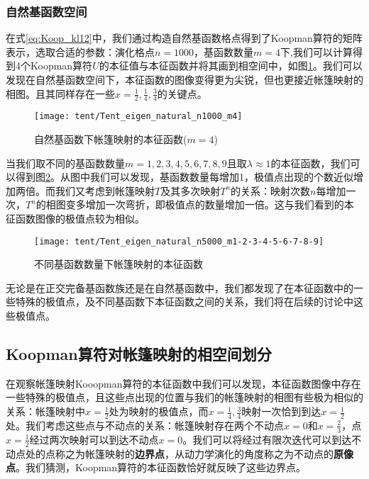 \subsubsection{自然基函数空间}
在式\eqref{eq:Koop_kl12}中，我们通过构造自然基函数格点得到了Koopman算符的矩阵表示，选取合适的参数：演化格点$n=1000$，基函数数量$m=4$下,我们可以计算得到4个Koopman算符$U$的本征值与本征函数并将其画到相空间中，如图\ref{fig:Tent_eigen_natural_n1000_m4}。我们可以发现在自然基函数空间下，本征函数的图像变得更为尖锐，但也更接近帐篷映射的相图。且其同样存在一些$x=\frac{1}{2},\frac{1}{4},\frac{3}{4}$的关键点。
\begin{figure}[!]
	\centering
	\texttt{[image: tent/Tent\_eigen\_natural\_n1000\_m4]}
    \caption{自然基函数下帐篷映射的本征函数($m=4$)}\label{fig:Tent_eigen_natural_n1000_m4}
\end{figure}

当我们取不同的基函数数量$m=1,2,3,4,5,6,7,8,9$且取$\lambda\approx 1$的本征函数，我们可以得到图\ref{Tent_eigen_natural_n5000_m1-2-3-4-5-6-7-8-9}。从图中我们可以发现，基函数数量每增加1，极值点出现的个数近似增加两倍。而我们又考虑到帐篷映射$T$及其多次映射$T^n$的关系：映射次数$n$每增加一次，$T^n$的相图变多增加一次弯折，即极值点的数量增加一倍。这与我们看到的本征函数图像的极值点较为相似。

\begin{figure}[!]
	\centering
	\texttt{[image: tent/Tent\_eigen\_natural\_n5000\_m1-2-3-4-5-6-7-8-9]}
    \caption{不同基函数数量下帐篷映射的本征函数}\label{Tent_eigen_natural_n5000_m1-2-3-4-5-6-7-8-9}
\end{figure}

无论是在正交完备基函数族还是在自然基函数中，我们都发现了在本征函数中的一些特殊的极值点，及不同基函数下本征函数之间的关系，我们将在后续的讨论中这些极值点。

\subsection{Koopman算符对帐篷映射的相空间划分}
在观察帐篷映射Kooopman算符的本征函数中我们可以发现，本征函数图像中存在一些特殊的极值点，且这些点出现的位置与我们的帐篷映射的相图有些极为相似的关系：帐篷映射中$x=\frac{1}{2}$处为映射的极值点，而$x=\frac{1}{4},\frac{3}{4}$映射一次恰到到达$x=\frac{1}{2}$处。我们考虑这些点与不动点的关系：帐篷映射存在两个不动点$x=0$和$x=\frac{2}{3}$，点$x=\frac{1}{2}$经过两次映射可以到达不动点$x=0$。我们可以将经过有限次迭代可以到达不动点处的点称之为帐篷映射的\textbf{边界点}，从动力学演化的角度称之为不动点的\textbf{原像点}。我们猜测，Koopman算符的本征函数恰好就反映了这些边界点。

